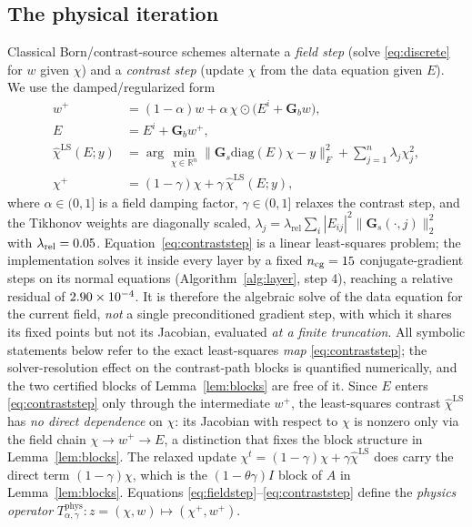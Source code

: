 \documentclass[journal,cmes,article,submit,moreauthors,pdftex]{Definitions/tsp}
\newcommand{\R}{\mathbb{R}}
\newcommand{\norm}[1]{\lVert #1 \rVert}
\newcommand{\numv}[1]{#1}
\begin{document}
\subsection{The physical iteration}
Classical Born/contrast-source schemes alternate a \emph{field step} (solve \eqref{eq:discrete}
for $w$ given $\chi$) and a \emph{contrast step} (update $\chi$ from the data equation given
$E$). We use the damped/regularized form
\begin{align}
w^{+} &= (1-\alpha)w+\alpha\,\chi\odot\big(E^{i}+\mathbf{G}_b w\big),
\label{eq:fieldstep}\\
E &= E^{i}+\mathbf{G}_b w^{+},
\label{eq:Estep}\\
\hat\chi^{\mathrm{LS}}(E;y) &= \arg\min_{\chi\in\R^{n}}\big\|\mathbf{G}_s\mathrm{diag}(E)\chi-y\big\|_F^{2}+\sum_{j=1}^{n}\lambda_j\chi_j^{2},
\label{eq:contraststep}\\
\chi^{+} &= (1-\gamma)\chi+\gamma\,\hat\chi^{\mathrm{LS}}(E;y),
\label{eq:chiupd}
\end{align}
where $\alpha\in(0,1]$ is a field damping factor, $\gamma\in(0,1]$ relaxes the contrast step, and
the Tikhonov weights are diagonally scaled,
$\lambda_j=\lambda_{\mathrm{rel}}\sum_i|E_{ij}|^{2}\norm{\mathbf{G}_s(\cdot,j)}_2^{2}$ with
$\lambda_{\mathrm{rel}}=\numv{\NumLamRel}$. Equation~\eqref{eq:contraststep} is a linear
least-squares problem; the implementation solves it inside every layer by a fixed
$n_{\mathrm{cg}}=\numv{\NumNCg}$ conjugate-gradient steps on its normal equations
(Algorithm~\ref{alg:layer}, step 4), reaching a relative residual of $\numv{\NumCgResidImpl}$. It is
therefore the algebraic solve of the data equation for the current field, \emph{not} a single
preconditioned gradient step, with which it shares its fixed points but not its Jacobian, evaluated
\emph{at a finite truncation}. All symbolic statements below refer to the exact least-squares
\emph{map} \eqref{eq:contraststep}; the solver-resolution effect on the contrast-path
blocks is quantified numerically, and the two certified blocks of Lemma~\ref{lem:blocks} are
free of it. Since $E$ enters \eqref{eq:contraststep} only
through the intermediate $w^{+}$, the least-squares contrast $\hat\chi^{\mathrm{LS}}$ has
\emph{no direct dependence} on $\chi$: its
Jacobian with respect to $\chi$ is nonzero only via the field chain
$\chi\to w^{+}\to E$, a distinction that fixes the block structure in Lemma~\ref{lem:blocks}.
The relaxed update $\chi^{t}=(1-\gamma)\chi+\gamma\hat\chi^{\mathrm{LS}}$ does carry the direct term $(1-\gamma)\chi$, which is the $(1-\theta\gamma)I$ block of $A$ in Lemma~\ref{lem:blocks}.
Equations \eqref{eq:fieldstep}--\eqref{eq:contraststep} define the \emph{physics operator}
$T^{\mathrm{phys}}_{\alpha,\gamma}: z=(\chi,w)\mapsto(\chi^{+},w^{+})$.
\end{document}
